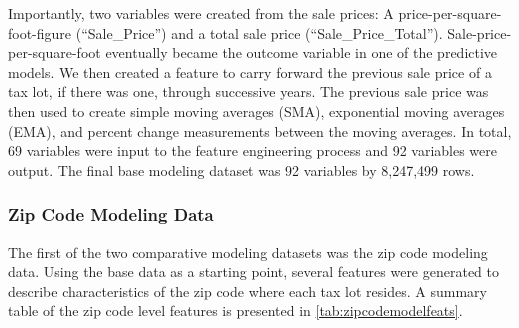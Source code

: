 \documentclass[12pt,]{article}
\begin{document}
Importantly, two variables were created from the sale prices: A
price-per-square-foot-figure (``Sale\_Price'') and a total sale price
(``Sale\_Price\_Total''). Sale-price-per-square-foot eventually became
the outcome variable in one of the predictive models. We then created a
feature to carry forward the previous sale price of a tax lot, if there
was one, through successive years. The previous sale price was then used
to create simple moving averages (SMA), exponential moving averages
(EMA), and percent change measurements between the moving averages. In
total, 69 variables were input to the feature engineering process and 92
variables were output. The final base modeling dataset was 92 variables
by 8,247,499 rows.

\hypertarget{zip-code-modeling-data}{%
\subsubsection{Zip Code Modeling Data}\label{zip-code-modeling-data}}

The first of the two comparative modeling datasets was the zip code
modeling data. Using the base data as a starting point, several features
were generated to describe characteristics of the zip code where each
tax lot resides. A summary table of the zip code level features is
presented in \ref{tab:zipcodemodelfeats}.
\end{document}
